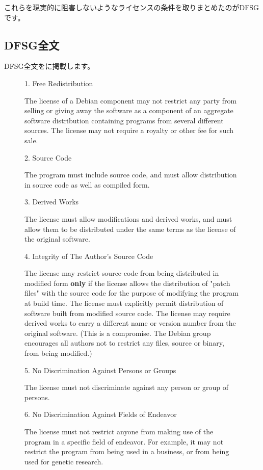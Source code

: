 \documentclass[mingoth,a4paper]{jsarticle}
\begin{document}
これらを現実的に阻害しないようなライセンスの条件を取りまとめたのがDFSGです。

\subsection{DFSG全文}

DFSG全文をに掲載します。

\begin{figure}[h]
 \begin{multicols}{2}
 {\small
     1. Free Redistribution

       The license of a Debian component may not restrict any party from
       selling or giving away the software as a component of an aggregate
       software distribution containing programs from several different
       sources. The license may not require a royalty or other fee for
       such sale.

    2. Source Code

       The program must include source code, and must allow distribution
       in source code as well as compiled form.

    3. Derived Works

       The license must allow modifications and derived works, and must
       allow them to be distributed under the same terms as the license
       of the original software.

    4. Integrity of The Author's Source Code

       The license may restrict source-code from being distributed in
       modified form {\bf only} if the license allows the distribution of
       "patch files" with the source code for the purpose of modifying
       the program at build time. The license must explicitly permit
       distribution of software built from modified source code. The
       license may require derived works to carry a different name or
       version number from the original software. (This is a compromise.
       The Debian group encourages all authors not to restrict any files,
       source or binary, from being modified.)

    5. No Discrimination Against Persons or Groups

       The license must not discriminate against any person or group of
       persons.

    6. No Discrimination Against Fields of Endeavor

       The license must not restrict anyone from making use of the
       program in a specific field of endeavor. For example, it may not
       restrict the program from being used in a business, or from being
       used for genetic research.

}
\end{multicols}
\end{figure}
\end{document}
